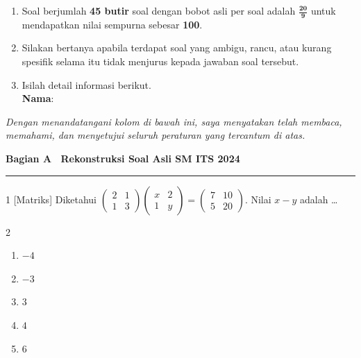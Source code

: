 \documentclass[11pt]{article}
\newenvironment{pilB}{%
  \par\smallskip\begin{multicols}{2}
  \begin{enumerate}[label=(\alph*),leftmargin=*,itemsep=1pt,topsep=3pt]}%
  {\end{enumerate}\end{multicols}}
\begin{document}
\begin{enumerate}[leftmargin=*,itemsep=4pt,topsep=4pt]
  \item Soal berjumlah \textbf{45 butir} soal dengan bobot asli per soal adalah
        $\mathbf{\tfrac{20}{9}}$ untuk mendapatkan nilai sempurna sebesar \textbf{100}.

  \item Silakan bertanya apabila terdapat soal yang ambigu, rancu, atau kurang
        spesifik selama itu tidak menjurus kepada jawaban soal tersebut.

  \item Isilah detail informasi berikut.\\[0.3em]
        \textbf{Nama}\hspace{0.45cm}:\enspace\underline{\hspace{8cm}}
\end{enumerate}

\vspace{0.6cm}
\noindent\textit{Dengan menandatangani kolom di bawah ini, saya menyatakan telah membaca,
memahami, dan menyetujui seluruh peraturan yang tercantum di atas.}

\vspace{0.6cm}
\noindent{}

\clearpage


{\noindent\large\bfseries Bagian A \textendash\ Rekonstruksi Soal Asli SM ITS 2024\par}
\smallskip\hrule\medskip

\begin{soal}{1 \normalfont\small[Matriks]}
Diketahui $\begin{pmatrix}2&1\\1&3\end{pmatrix}\begin{pmatrix}x&2\\1&y\end{pmatrix}=\begin{pmatrix}7&10\\5&20\end{pmatrix}$.
Nilai $x-y$ adalah \ldots
\begin{pilB}
  \item $-4$ \item $-3$ \item $3$ \item $4$ \item $6$
\end{pilB}
\end{soal}
\end{document}
